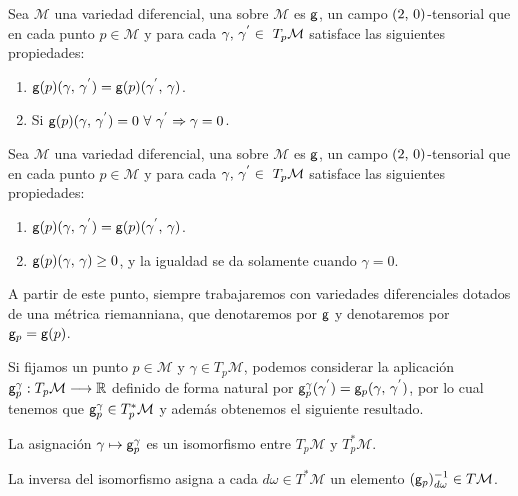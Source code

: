 \begin{definition}
	Sea $\mathcal{M}$ una variedad diferencial, una  sobre $\mathcal{M}$ es $\mathsf{g}$, un campo
	$(2,\thinspace 0)$-tensorial que en cada punto $p\in\mathcal{M}$ y para cada $\gamma\coma\gamma^{'}\in\ T_p\mathcal{M}$ satisface las siguientes propiedades:
	\begin{enumerate}
		\item $\mathsf{g}(p)(\gamma,\thinspace \gamma^{'})=\mathsf{g}(p)(\gamma^{'},\thinspace \gamma)$.
		\item Si $\mathsf{g}(p)(\gamma,\thinspace \gamma^{'})=0\ \forall\ \gamma^{'}\Rightarrow\gamma=0$.
	\end{enumerate}
\end{definition}

\begin{definition}
	Sea $\mathcal{M}$ una variedad diferencial, una  sobre $\mathcal{M}$ es $\mathsf{g}$, un campo
	$(2,\thinspace 0)$-tensorial que en cada punto $p\in\mathcal{M}$ y para cada $\gamma\coma\gamma^{'}\in\ T_p\mathcal{M}$ satisface las siguientes propiedades:
	\begin{enumerate}
		\item $\mathsf{g}(p)(\gamma,\thinspace \gamma^{'})=\mathsf{g}(p)(\gamma^{'},\thinspace \gamma)$.
		\item $\mathsf{g}(p)(\gamma,\thinspace \gamma)\geq 0$, y la igualdad se da solamente cuando $\gamma = 0$.
	\end{enumerate}
\end{definition}

A partir de este punto, siempre trabajaremos con variedades diferenciales dotados de una métrica riemanniana, que denotaremos por $\mathsf{g}$ y
denotaremos por $\mathsf{g}_p=\mathsf{g}(p)$.

Si fijamos un punto $p\in\mathcal{M}$ y $\gamma\in T_p\mathcal{M}$, podemos considerar la aplicación $\mathsf{g}_p^\gamma:T_p\mathcal{M}\longrightarrow \mathbb{R}$ definido
de forma natural por $\mathsf{g}_p^\gamma(\gamma^{'})=\mathsf{g}_p(\gamma,\thinspace\gamma^{'})$, por lo cual tenemos que
$\mathsf{g}_p^\gamma\in T^*_p\mathcal{M}$ y además obtenemos el siguiente resultado.
\begin{result}\label{res:metrica-isomorfismo}
La asignación $\gamma\mapsto\mathsf{g}_p^\gamma$ es un isomorfismo entre $T_p\mathcal{M}$ y $T_p^*\mathcal{M}$.
\end{result}
La inversa del isomorfismo asigna a cada $d\omega\in T^*\mathcal{M}$ un elemento $(\mathsf{g}_p)^{-1}_{d\omega}\in
T\mathcal{M}$.

